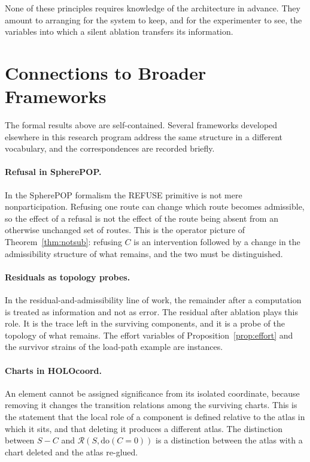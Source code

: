 \documentclass[11pt]{article}
\theoremstyle{definition}
\theoremstyle{remark}
\newcommand{\Rop}{\mathcal{R}}
\newcommand{\dox}[1]{\mathrm{do}(#1)}
\begin{document}
None of these principles requires knowledge of the architecture in advance. They amount to arranging for the system to keep, and for the experimenter to see, the variables into which a silent ablation transfers its information.

\section{Connections to Broader Frameworks}\label{sec:framework}

The formal results above are self-contained. Several frameworks developed elsewhere in this research program address the same structure in a different vocabulary, and the correspondences are recorded briefly.

\paragraph{Refusal in SpherePOP.}
In the SpherePOP formalism the REFUSE primitive is not mere nonparticipation. Refusing one route can change which route becomes admissible, so the effect of a refusal is not the effect of the route being absent from an otherwise unchanged set of routes. This is the operator picture of Theorem~\ref{thm:notsub}: refusing $C$ is an intervention followed by a change in the admissibility structure of what remains, and the two must be distinguished.

\paragraph{Residuals as topology probes.}
In the residual-and-admissibility line of work, the remainder after a computation is treated as information and not as error. The residual after ablation plays this role. It is the trace left in the surviving components, and it is a probe of the topology of what remains. The effort variables of Proposition~\ref{prop:effort} and the survivor strains of the load-path example are instances.

\paragraph{Charts in HOLOcoord.}
An element cannot be assigned significance from its isolated coordinate, because removing it changes the transition relations among the surviving charts. This is the statement that the local role of a component is defined relative to the atlas in which it sits, and that deleting it produces a different atlas. The distinction between $S-C$ and $\Rop(S,\dox{C=0})$ is a distinction between the atlas with a chart deleted and the atlas re-glued.
\end{document}
